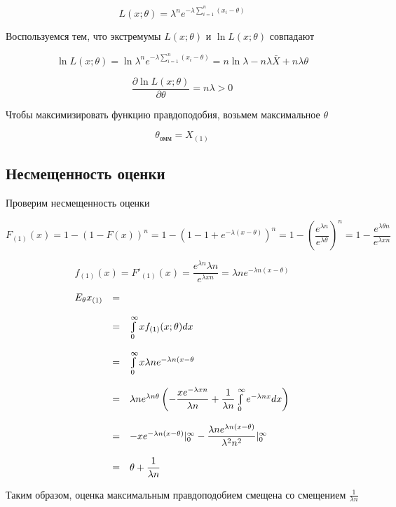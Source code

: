 \documentclass[a4paper,12pt, oneside]{book}
\let\int\varint
\begin{document}
$$
L(x;\theta) = \lambda^n e^{-\lambda \sum_{i=1}^n (x_i - \theta)}
$$

Воспользуемся тем, что экстремумы $ L(x; \theta) $ и $ \ln L(x; \theta) $ совпадают

$$
\ln L (x; \theta) = \ln \lambda^n e^{-\lambda \sum_{i=1}^n (x_i - \theta)} = n \ln \lambda - n \lambda \bar{X} + n \lambda \theta 
$$

$$
\dfrac{\partial \ln L(x; \theta)}{\partial \theta} = n \lambda > 0
$$

Чтобы максимизировать функцию правдоподобия, возьмем максимальное $ \theta $

$$
\theta_\text{омм} = X_{(1)}
$$

\subsection{Несмещенность оценки}

Проверим несмещенность оценки

$$
F_{(1)} (x) = 1 - (1 - F(x))^n = 1-(1-1+e^{- \lambda (x - \theta)})^n = 1 - \left(  \dfrac{e^{\lambda n}}{e^{\lambda \theta}} \right)^n = 1 - \dfrac{e^{\lambda \theta n}}{e^{\lambda x n}}
$$

$$
f_{(1)} (x) = F'_(1)(x) = \dfrac{e^{\lambda n} \lambda n}{e^{\lambda x n}} = \lambda n e^{-\lambda n (x- \theta)}
$$


$$
\begin{array}{lcl}
	E_\theta x_{(1)} &=\\
	\\
	&=& \int\limits_{0}^{\infty} x f_{(1)} (x; \theta) dx \\
	\\
	&=&\int\limits_{0}^{\infty} x \lambda n e^{-\lambda n (x- \theta} \\
	\\
	&=&\lambda n e^{\lambda n \theta} \left( - \dfrac{x e^{- \lambda x n}}{\lambda n} + \dfrac{1}{\lambda n} \int\limits_{0}^{\infty} e^{-\lambda n x}dx \right)  \\
	\\
	&=&-x e^{-\lambda n (x- \theta)}|_0^\infty - \dfrac{\lambda n e^{\lambda n (x - \theta)}}{\lambda^2 n^2}|_0^\infty\\
	\\
	&=&\theta + \dfrac{1}{\lambda n}
\end{array}
$$

Таким образом, оценка максимальным правдоподобием смещена со смещением $ \frac{1}{\lambda n} $
\end{document}
